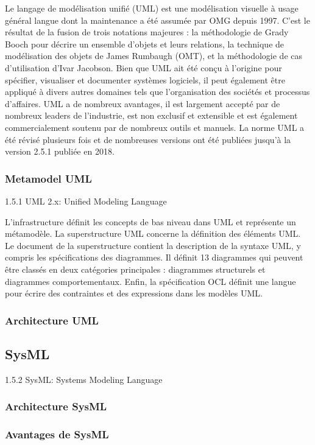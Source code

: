 \documentclass[french]{spimufcphdthesis}
\begin{document}
Le langage de modélisation unifié (UML) est une modélisation visuelle à usage général langue dont la maintenance a été assumée par OMG depuis 1997. C'est le résultat de la fusion de trois notations majeures : la méthodologie de Grady Booch pour décrire un ensemble d'objets et leurs relations, la technique de modélisation des objets de James Rumbaugh (OMT), et la méthodologie de cas d'utilisation d'Ivar Jacobson.
Bien que UML ait été conçu à l'origine pour spécifier, visualiser et documenter systèmes logiciels, il peut également être appliqué à divers autres domaines tels que l’organisation des sociétés et processus d'affaires. UML a de nombreux avantages, il est largement accepté par de nombreux leaders de l'industrie, est non exclusif et extensible et est également commercialement soutenu par de nombreux outils et manuels. La norme UML a été révisé plusieurs fois et de nombreuses versions ont été publiées jusqu’à la version 2.5.1 publiée en 2018. 

\subsubsection{Metamodel UML}
1.5.1 UML 2.x: Unified Modeling Language

L'infrastructure définit les concepts de bas niveau dans UML et représente un métamodèle. La superstructure UML concerne la définition des éléments UML. Le document de la superstructure contient la description de la syntaxe UML, y compris les spécifications des diagrammes. Il définit 13 diagrammes qui peuvent être classés en deux catégories principales : diagrammes structurels et diagrammes comportementaux. Enfin, la spécification OCL définit une langue pour écrire des contraintes et des expressions dans les modèles UML.
\subsubsection{Architecture UML}
\subsection{SysML}
1.5.2 SysML: Systems Modeling Language
\subsubsection{Architecture SysML}
\subsubsection{Avantages de SysML}
\end{document}
